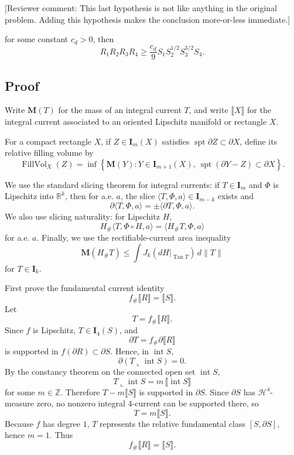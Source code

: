 \documentclass[12pt]{article}
\begin{document}
[Reviewer comment: This last hypothesis is not like anything in the original problem.  Adding this hypothesis makes the conclusion more-or-less immediate.]

for some constant \(c_d>0\), then
\[
R_1R_2R_3R_4
\ge
\frac{c_d}{9}S_1S_2^{1/2}S_3^{3/2}S_4.
\]

\subsection*{Proof}

Write \(\mathbf M(T)\) for the mass of an integral current \(T\), and write \(\llbracket X\rrbracket\) for the integral current associated to an oriented Lipschitz manifold or rectangle \(X\).

For a compact rectangle \(X\), if \(Z\in \mathbf I_m(X)\) satisfies \(\operatorname{spt}\partial Z\subset \partial X\), define its relative filling volume by
\[
\operatorname{FillVol}_X(Z)
=
\inf\left\{
\mathbf M(Y):
Y\in \mathbf I_{m+1}(X),\
\operatorname{spt}(\partial Y-Z)\subset \partial X
\right\}.
\]

We use the standard slicing theorem for integral currents: if \(T\in \mathbf I_m\) and \(\Phi\) is Lipschitz into \(\mathbb R^k\), then for a.e. \(a\), the slice \(\langle T,\Phi,a\rangle\in \mathbf I_{m-k}\) exists and
\[
\partial\langle T,\Phi,a\rangle
=
\pm \langle \partial T,\Phi,a\rangle.
\]
We also use slicing naturality: for Lipschitz \(H\),
\[
H_\#\langle T,\Phi\circ H,a\rangle
=
\langle H_\#T,\Phi,a\rangle
\]
for a.e. \(a\). Finally, we use the rectifiable-current area inequality
\[
\mathbf M(H_\#T)
\le
\int J_k(dH|_{\operatorname{Tan}T})\,d\|T\|
\]
for \(T\in\mathbf I_k\).

First prove the fundamental current identity
\[
f_\#\llbracket R\rrbracket=\llbracket S\rrbracket .
\]
Let
\[
T=f_\#\llbracket R\rrbracket.
\]
Since \(f\) is Lipschitz, \(T\in\mathbf I_4(S)\), and
\[
\partial T=f_\#\partial\llbracket R\rrbracket
\]
is supported in \(f(\partial R)\subset \partial S\). Hence, in \(\operatorname{int}S\),
\[
\partial(T\llcorner \operatorname{int}S)=0.
\]
By the constancy theorem on the connected open set \(\operatorname{int}S\),
\[
T\llcorner \operatorname{int}S
=
m\,\llbracket \operatorname{int}S\rrbracket
\]
for some \(m\in\mathbb Z\). Therefore \(T-m\llbracket S\rrbracket\) is supported in \(\partial S\). Since \(\partial S\) has \(\mathcal H^4\)-measure zero, no nonzero integral \(4\)-current can be supported there, so
\[
T=m\llbracket S\rrbracket.
\]
Because \(f\) has degree \(1\), \(T\) represents the relative fundamental class \([S,\partial S]\), hence \(m=1\). Thus
\[
f_\#\llbracket R\rrbracket=\llbracket S\rrbracket .
\]
\end{document}
